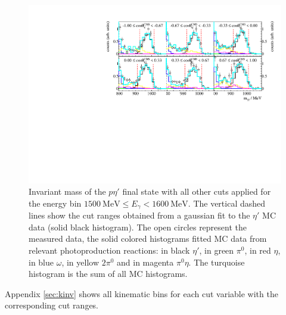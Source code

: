 \begin{figure}[htbp]
 	\centering
 	\includegraphics[width=\linewidth]{../figs/hydrogen/bin_cuts/invcut_ebin1.pdf}
 	\caption{Invariant mass of the $p\eta'$ final state with all other cuts applied for the energy bin $\SI{1500}{\mega\eV}\leq E_\gamma<\SI{1600}{\mega\eV}$. The vertical dashed lines show the cut ranges obtained from a gaussian fit to the $\eta'$ MC data (solid black histogram). The open circles represent the measured data, the solid colored histograms fitted MC data from relevant photoproduction reactions: in black $\eta'$, in green $\pi^0$, in red $\eta$, in blue $\omega$, in yellow $2\pi^0$ and in magenta $\pi^0\eta$. The turquoise histogram is the sum of all MC histograms.}
 	\label{fig:invm}
\end{figure}

Appendix \ref{sec:kinv} shows all kinematic bins for each cut variable with the corresponding cut ranges.
